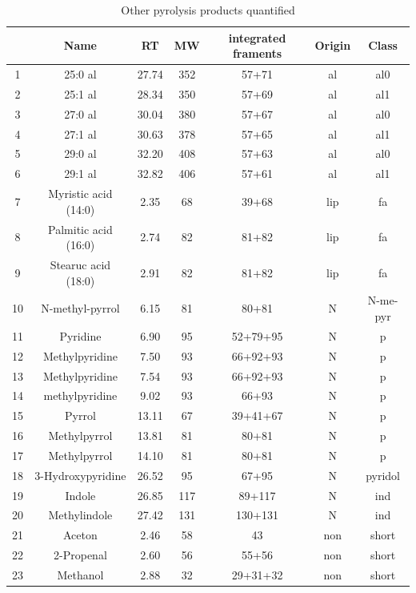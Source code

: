 \documentclass[preprint,review,12pt]{elsarticle}
\begin{document}
\newpage
\begin{table}[h!]
\begin{center}
\caption{Other pyrolysis products quantified}
\label{tab:nprod}
{\tiny
\begin{tabular}{ccccccc}
  \hline
 & Name & RT & MW & integrated framents & Origin & Class \\ 
  \hline
1 & 25:0 al & 27.74 & 352 & 57+71 & al & al0 \\ 
  2 & 25:1 al & 28.34 & 350 & 57+69 & al & al1 \\ 
  3 & 27:0 al & 30.04 & 380 & 57+67 & al & al0 \\ 
  4 & 27:1 al & 30.63 & 378 & 57+65 & al & al1 \\ 
  5 & 29:0 al & 32.20 & 408 & 57+63 & al & al0 \\ 
  6 & 29:1 al & 32.82 & 406 & 57+61 & al & al1 \\ 
  7 & Myristic acid (14:0) & 2.35 & 68 & 39+68 & lip & fa \\ 
  8 & Palmitic acid (16:0) & 2.74 & 82 & 81+82 & lip & fa \\ 
  9 & Stearuc acid (18:0) & 2.91 & 82 & 81+82 & lip & fa \\ 
  10 & N-methyl-pyrrol & 6.15 & 81 & 80+81 & N & N-me-pyr \\ 
  11 & Pyridine & 6.90 & 95 & 52+79+95 & N & p \\ 
  12 & Methylpyridine & 7.50 & 93 & 66+92+93 & N & p \\ 
  13 & Methylpyridine & 7.54 & 93 & 66+92+93 & N & p \\ 
  14 & methylpyridine & 9.02 & 93 & 66+93 & N & p \\ 
  15 & Pyrrol & 13.11 & 67 & 39+41+67 & N & p \\ 
  16 & Methylpyrrol & 13.81 & 81 & 80+81 & N & p \\ 
  17 & Methylpyrrol & 14.10 & 81 & 80+81 & N & p \\ 
  18 & 3-Hydroxypyridine & 26.52 & 95 & 67+95 & N & pyridol \\ 
  19 & Indole & 26.85 & 117 & 89+117 & N & ind \\ 
  20 & Methylindole & 27.42 & 131 & 130+131 & N & ind \\ 
  21 & Aceton & 2.46 & 58 & 43 & non & short \\ 
  22 & 2-Propenal & 2.60 & 56 & 55+56 & non & short \\ 
  23 & Methanol & 2.88 & 32 & 29+31+32 & non & short \\ 

\end{tabular}}
\end{center}
\end{table}
\end{document}
